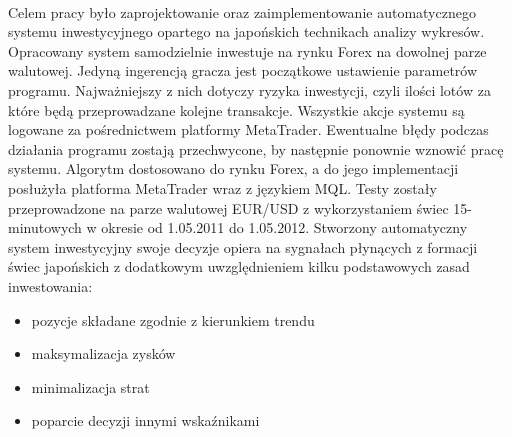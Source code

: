 \documentclass[pdflatex,11pt]{aghdpl}
\begin{document}
\paragraph{}
Celem pracy było zaprojektowanie oraz zaimplementowanie automatycznego systemu inwestycyjnego opartego na japońskich technikach analizy wykresów. Opracowany system samodzielnie inwestuje na rynku Forex na dowolnej parze walutowej. Jedyną ingerencją gracza jest początkowe ustawienie parametrów programu. Najważniejszy z nich dotyczy ryzyka inwestycji, czyli ilości lotów za które będą przeprowadzane kolejne transakcje. Wszystkie akcje systemu są logowane za pośrednictwem platformy MetaTrader. Ewentualne błędy podczas działania programu zostają przechwycone, by następnie ponownie wznowić pracę systemu. Algorytm dostosowano do rynku Forex, a do jego implementacji posłużyła platforma MetaTrader wraz z językiem MQL. Testy zostały przeprowadzone na parze walutowej EUR/USD z wykorzystaniem świec 15-minutowych w okresie od 1.05.2011 do 1.05.2012. Stworzony automatyczny system inwestycyjny swoje decyzje opiera na sygnałach płynących z formacji świec japońskich z dodatkowym uwzględnieniem kilku podstawowych zasad inwestowania: 
\begin{itemize}
\item pozycje składane zgodnie z kierunkiem trendu
\item maksymalizacja zysków
\item minimalizacja strat
\item poparcie decyzji innymi wskaźnikami
\end{itemize}
\end{document}
